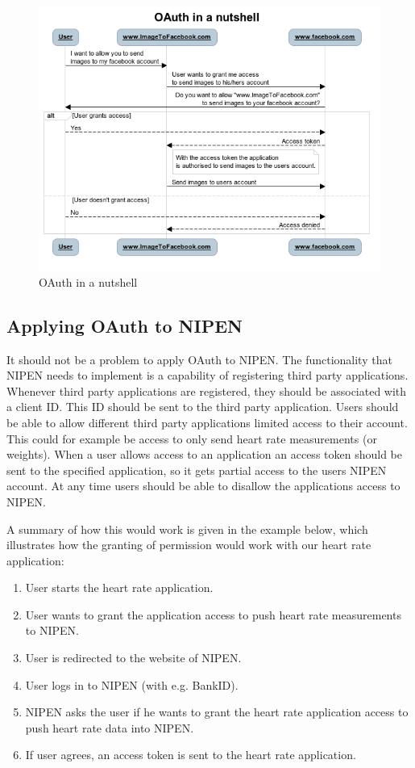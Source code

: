 \begin{figure}[h]
\centering
\includegraphics[scale=1.0]{../Figures/oauth-in-a-nutshell.png}
\caption{OAuth in a nutshell}
\label{figure:oauth-in-a-nutshell}
\end{figure}


\subsection{Applying OAuth to NIPEN}

It should not be a problem to apply OAuth to NIPEN.
The functionality that NIPEN needs to implement is a capability of registering third party applications.
Whenever third party applications are registered, they should be associated with a client ID.
This ID should be sent to the third party application.
Users should be able to allow different third party applications limited access to their account.
This could for example be access to only send heart rate measurements (or weights).
When a user allows access to an application an access token should be sent to the specified application, so it gets partial access to the users NIPEN account.
At any time users should be able to disallow the applications access to NIPEN.

A summary of how this would work is given in the example below, which illustrates how the granting of permission would work with our heart rate application:

\begin{enumerate}
\item User starts the heart rate application.
\item User wants to grant the application access to push heart rate measurements to NIPEN.
\item User is redirected to the website of NIPEN.
\item User logs in to NIPEN (with e.g. BankID).
\item NIPEN asks the user if he wants to grant the heart rate application access to push heart rate data into NIPEN.
\item If user agrees, an access token is sent to the heart rate application.
\end{enumerate}

